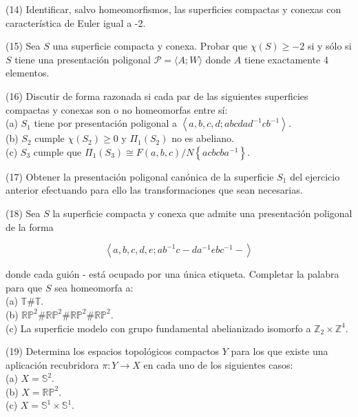 \documentclass[
  a4paper,
  spanish,
  12pt,
]{scrartcl}
\begin{document}
\begin{ejer}
(14) Identificar, salvo homeomorfismos, las superficies compactas y conexas con característica de Euler igual a -2.\\
\end{ejer}

\begin{ejer}
(15) Sea $S$ una superficie compacta y conexa. Probar que $\chi(S) \geq-2$ si y sólo si $S$ tiene una presentación poligonal $\mathscr{P}=\langle A ; W\rangle$ donde $A$ tiene exactamente 4 elementos.\\
\end{ejer}

\begin{ejer}
(16) Discutir de forma razonada si cada par de las siguientes superficies compactas y conexas son o no homeomorfas entre sí:\\
(a) $S_{1}$ tiene por presentación poligonal a $\left\langle a, b, c, d ; a b c d a d^{-1} c b^{-1}\right\rangle$.\\
(b) $S_{2}$ cumple $\chi\left(S_{2}\right) \geq 0$ y $\Pi_{1}\left(S_{2}\right)$ no es abeliano.\\
(c) $S_{3}$ cumple que $\Pi_{1}\left(S_{3}\right) \cong F(a, b, c) / N\left\{a c b c b a^{-1}\right\}$.\\
\end{ejer}

\begin{ejer}
(17) Obtener la presentación poligonal canónica de la superficie $S_{1}$ del ejercicio anterior efectuando para ello las transformaciones que sean necesarias.\\
\end{ejer}

\begin{ejer}
(18) Sea $S$ la superficie compacta y conexa que admite una presentación poligonal de la forma

$$
\left\langle a, b, c, d, e ; a b^{-1} c-d a^{-1} e b c^{-1}-\right\rangle
$$

donde cada guión - está ocupado por una única etiqueta. Completar la palabra para que $S$ sea homeomorfa a:\\
(a) $\mathbb{T} \# \mathbb{T}$.\\
(b) $\mathbb{R} \mathbb{P}^{2} \# \mathbb{R} \mathbb{P}^{2} \# \mathbb{R} \mathbb{P}^{2} \# \mathbb{R} \mathbb{P}^{2}$.\\
(c) La superficie modelo con grupo fundamental abelianizado isomorfo a $\mathbb{Z}_{2} \times \mathbb{Z}^{4}$.\\
\end{ejer}

\begin{ejer}
(19) Determina los espacios topológicos compactos $Y$ para los que existe una aplicación recubridora $\pi: Y \rightarrow X$ en cada uno de los siguientes casos:\\
(a) $X=\mathbb{S}^{2}$.\\
(b) $X=\mathbb{R} \mathbb{P}^{2}$.\\
(c) $X=\mathbb{S}^{1} \times \mathbb{S}^{1}$.
\end{ejer}
\end{document}
